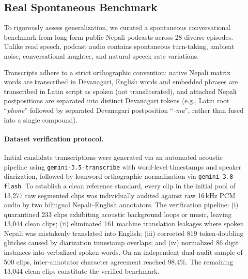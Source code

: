 \documentclass[10pt,twocolumn,a4paper]{article}
\begin{document}
\subsection{Real Spontaneous Benchmark}
To rigorously assess generalization, we curated a spontaneous conversational benchmark from long-form public Nepali podcasts across 28 diverse episodes. Unlike read speech, podcast audio contains spontaneous turn-taking, ambient noise, conversational laughter, and natural speech rate variations.

Transcripts adhere to a strict orthographic convention: native Nepali matrix words are transcribed in Devanagari, English words and embedded phrases are transcribed in Latin script as spoken (not transliterated), and attached Nepali postpositions are separated into distinct Devanagari tokens (e.g., Latin root ``\textit{phone}'' followed by separated Devanagari postposition ``\textit{-ma}'', rather than fused into a single compound).

\paragraph{Dataset verification protocol.}
Initial candidate transcriptions were generated via an automated acoustic pipeline using \texttt{gemini-3.5-transcribe} with word-level timestamps and speaker diarization, followed by loanword orthographic normalization via \texttt{gemini-3.8-flash}. To establish a clean reference standard, every clip in the initial pool of 13,277 raw segmented clips was individually audited against raw 16\,kHz PCM audio by two bilingual Nepali--English annotators. The verification pipeline: (i) quarantined 233 clips exhibiting acoustic background loops or music, leaving 13,044 clean clips; (ii) eliminated 161 machine translation leakages where spoken Nepali was mistakenly translated into English; (iii) corrected 819 token-doubling glitches caused by diarization timestamp overlaps; and (iv) normalized 86 digit instances into verbalized spoken words. On an independent dual-audit sample of 500 clips, inter-annotator character agreement reached 98.4\%. The remaining 13,044 clean clips constitute the verified benchmark.
\end{document}
